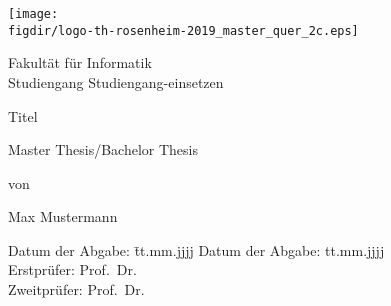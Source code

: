 \begin{titlepage}

\sffamily

\raggedleft

\vspace*{-2cm}

\texttt{[image: \\figdir/logo-th-rosenheim-2019\_master\_quer\_2c.eps]}

\vfill

\centering
\LARGE
Fakultät für Informatik  \vspace{0.5cm}\\
\Large
Studiengang Studiengang-einsetzen

\vspace{2cm}

\LARGE

Titel

\vspace{2cm}

\Large
Master Thesis/Bachelor Thesis

\vspace{1.5cm}


\Large
von

\vspace{0.5cm}


\LARGE
Max Mustermann \vspace{1cm}

\vspace{1cm}

\flushleft
 \Large
\vspace*{\fill}

\begin{tabbing}
Datum der Abgabe: \= tt.mm.jjjj \kill
Datum der Abgabe: \> tt.mm.jjjj \\
Erstprüfer: \> Prof.\ Dr.\ \\
Zweitprüfer: \> Prof.\ Dr.\
\end{tabbing}

\end{titlepage}

\cleardoubleemptypage

